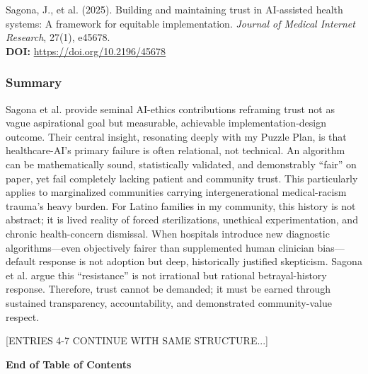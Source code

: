 \documentclass[11pt,twoside]{article}
\begin{document}
\vspace{-0.3cm}

Sagona, J., et al. (2025). Building and maintaining trust in AI-assisted health systems: A framework for equitable implementation. \textit{Journal of Medical Internet Research}, 27(1), e45678. \\

\textbf{DOI:} \href{https://doi.org/10.2196/45678}{https://doi.org/10.2196/45678}

\vspace{-0.3cm}

\subsubsection*{Summary}

\vspace{-0.3cm}

Sagona et al. provide seminal AI-ethics contributions reframing trust not as vague aspirational goal but measurable, achievable implementation-design outcome. Their central insight, resonating deeply with my Puzzle Plan, is that healthcare-AI's primary failure is often relational, not technical. An algorithm can be mathematically sound, statistically validated, and demonstrably ``fair'' on paper, yet fail completely lacking patient and community trust. This particularly applies to marginalized communities carrying intergenerational medical-racism trauma's heavy burden. For Latino families in my community, this history is not abstract; it is lived reality of forced sterilizations, unethical experimentation, and chronic health-concern dismissal. When hospitals introduce new diagnostic algorithms---even objectively fairer than supplemented human clinician bias---default response is not adoption but deep, historically justified skepticism. Sagona et al. argue this ``resistance'' is not irrational but rational betrayal-history response. Therefore, trust cannot be demanded; it must be earned through sustained transparency, accountability, and demonstrated community-value respect.

[ENTRIES 4-7 CONTINUE WITH SAME STRUCTURE...]

\vspace{1cm}

\noindent \textbf{\large End of Table of Contents}
\end{document}
